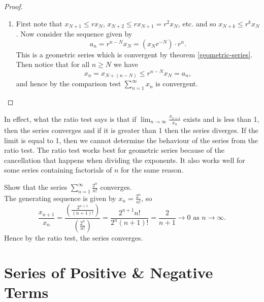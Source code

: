 \documentclass[../real_analysis.tex]{subfiles}
\begin{document}
        \begin{proof}\\
            \begin{enumerate}[label={\upshape(\roman*)}]
                \item First note that $x_{N+1}\leq rx_N$, $x_{N+2}\leq rx_{N+1}=r^2x_N$, etc. and so $x_{N+k}\leq r^kx_N$. Now consider the sequence given by
                \begin{equation*}
                    a_n=r^{n-N}x_N=(x_Nr^{-N})\cdot r^n.
                \end{equation*}
                This is a geometric series which is convergent by theorem \ref{geometric-series}. Then notice that for all $n\geq N$ we have
                \begin{equation*}
                    x_n=x_{N+(n-N)}\leq r^{n-N}x_N=a_n,
                \end{equation*}
                and hence by the comparison test $\sum_{n=1}^\infty x_n$ is convergent.
            \end{enumerate}
        \end{proof}
        In effect, what the ratio test says is that if $\lim_{n\to\infty}\frac{x_{x+1}}{x_n}$ exists and is less than 1, then the series converges and if it is greater than 1 then the series diverges. If the limit is equal to 1, then we cannot determine the behaviour of the series from the ratio test. The ratio test works best for geometric series because of the cancellation that happens when dividing the exponents. It also works well for some series containing factorials of $n$ for the same reason.
        \begin{example}
            Show that the series $\sum_{n=1}^\infty\frac{2^n}{n!}$ converges.\\
            The generating sequence is given by $x_n=\frac{2^n}{n!}$, so
            \begin{equation*}
                \frac{x_{n+1}}{x_n}=\frac{\left(\frac{2^{n+1}}{(n+1)!}\right)}{\left(\frac{2^n}{n!}\right)}=\frac{2^{n+1}n!}{2^n(n+1)!}=\frac{2}{n+1}\to0\text{ as }n\to\infty.
            \end{equation*}
            Hence by the ratio test, the series converges.
        \end{example}

    \section{Series of Positive \& Negative Terms}
\end{document}

